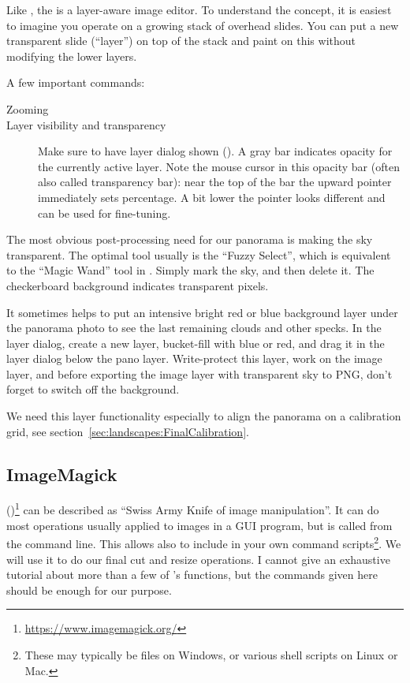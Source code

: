 Like , the  is a layer-aware image
editor. To understand the concept, it is easiest to imagine you
operate on a growing stack of overhead slides. You can put a new
transparent slide (``layer'') on top of the stack and paint on this
without modifying the lower layers.



A few important commands:

\begin{description}
\item[Zooming] 
\item[Layer visibility and transparency] Make sure to have layer
  dialog shown (). A gray bar indicates
  opacity for the currently active layer. Note the mouse cursor in
  this opacity bar (often also called transparency bar): near the top
  of the bar the upward pointer immediately sets percentage. A bit
  lower the pointer looks different and can be used for fine-tuning.
\end{description}


The most obvious post-processing need for our panorama is making the sky
transparent. The optimal tool usually is the ``Fuzzy Select'', which
is equivalent to the ``Magic Wand'' tool in . Simply mark the
sky, and then delete it. The checkerboard background indicates
transparent pixels.


It sometimes helps to put an intensive bright red or blue background layer under the
panorama photo to see the last remaining clouds and other specks. In the layer dialog,
create a new layer, bucket-fill with blue or red, and drag it in the
layer dialog below the pano layer. Write-protect this layer, work on
the image layer, and before exporting the image layer with transparent
sky to PNG, don't forget to switch off the background.

We need this layer functionality especially to align the panorama on a
calibration grid, see section~\ref{sec:landscapes:FinalCalibration}.





\subsection{ImageMagick}
\label{sec:landscapes:ImageMagick}

()\footnote{\url{https://www.imagemagick.org/}} can be
described as ``Swiss Army Knife of image manipulation''. It can do
most operations usually applied to images in a GUI program, but is
called from the command line. This allows also to include 
in your own command scripts\footnote{These may typically be
   files on Windows, or various shell scripts on Linux or
  Mac.}. We will use it to do our final cut and resize operations. I
cannot give an exhaustive tutorial about more than a few of
's functions, but the commands given here should be enough
for our purpose.

